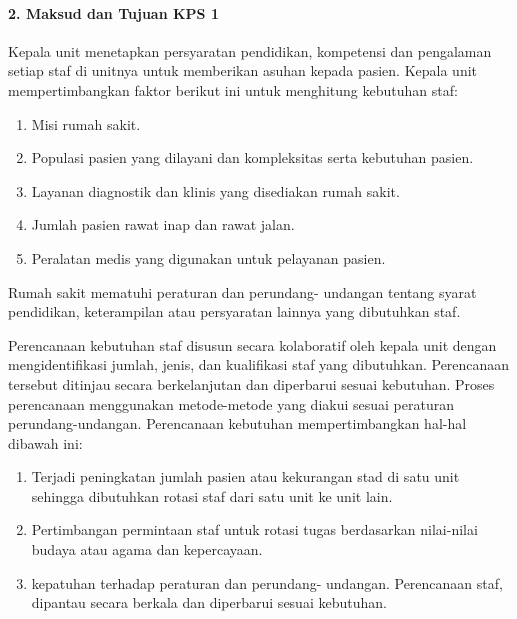 \documentclass[
]{book}
\providecommand{\tightlist}{%
  \setlength{\itemsep}{0pt}\setlength{\parskip}{0pt}}
\begin{document}
\hypertarget{maksud-dan-tujuan-kps-1}{%
\paragraph*{2. Maksud dan Tujuan KPS 1}\label{maksud-dan-tujuan-kps-1}}

Kepala unit menetapkan persyaratan pendidikan, kompetensi dan pengalaman setiap staf di unitnya untuk memberikan asuhan kepada pasien. Kepala unit mempertimbangkan faktor berikut ini untuk menghitung kebutuhan staf:

\begin{enumerate}
\def\labelenumi{\alph{enumi}.}
\tightlist
\item
  Misi rumah sakit.
\item
  Populasi pasien yang dilayani dan kompleksitas serta kebutuhan pasien.
\item
  Layanan diagnostik dan klinis yang disediakan rumah sakit.
\item
  Jumlah pasien rawat inap dan rawat jalan.
\item
  Peralatan medis yang digunakan untuk pelayanan pasien.
\end{enumerate}

Rumah sakit mematuhi peraturan dan perundang- undangan tentang syarat pendidikan, keterampilan atau persyaratan lainnya yang dibutuhkan staf.

Perencanaan kebutuhan staf disusun secara kolaboratif oleh kepala unit dengan mengidentifikasi jumlah, jenis, dan kualifikasi staf yang dibutuhkan. Perencanaan tersebut ditinjau secara berkelanjutan dan diperbarui sesuai kebutuhan.
Proses perencanaan menggunakan metode-metode yang diakui sesuai peraturan perundang-undangan. Perencanaan kebutuhan mempertimbangkan hal-hal dibawah ini:

\begin{enumerate}
\def\labelenumi{\alph{enumi}.}
\tightlist
\item
  Terjadi peningkatan jumlah pasien atau kekurangan stad di satu unit sehingga dibutuhkan rotasi staf dari satu unit ke unit lain.
\item
  Pertimbangan permintaan staf untuk rotasi tugas berdasarkan nilai-nilai budaya atau agama dan kepercayaan.
\item
  kepatuhan terhadap peraturan dan perundang- undangan.
  Perencanaan staf, dipantau secara berkala dan diperbarui sesuai kebutuhan.
\end{enumerate}
\end{document}
